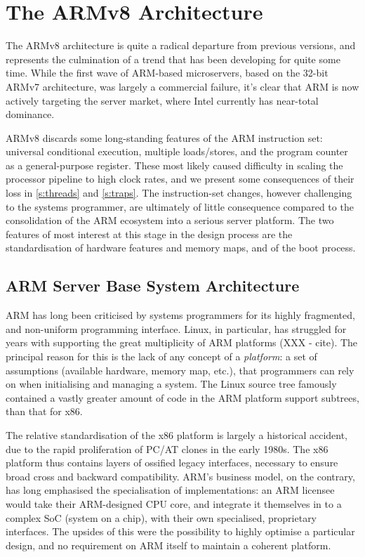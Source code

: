 \documentclass[a4paper,twoside]{report}
\begin{document}
\section{The ARMv8 Architecture}

The ARMv8 architecture is quite a radical departure from previous versions,
and represents the culmination of a trend that has been developing for quite
some time. While the first wave of ARM-based microservers, based on the 32-bit
ARMv7 architecture, was largely a commercial failure, it's clear that ARM is
now actively targeting the server market, where Intel currently has near-total
dominance.

ARMv8 discards some long-standing features of the ARM instruction set:
universal conditional execution, multiple loads/stores, and the program
counter as a general-purpose register. These most likely caused difficulty in
scaling the processor pipeline to high clock rates, and we present some
consequences of their loss in \autoref{s:threads} and \autoref{s:traps}. The
instruction-set changes, however challenging to the systems programmer, are
ultimately of little consequence compared to the consolidation of the ARM
ecosystem into a serious server platform. The two features of most interest at
this stage in the design process are the standardisation of hardware features
and memory maps, and of the boot process.

\subsection{ARM Server Base System Architecture}\label{s:sbsa}

ARM has long been criticised by systems programmers for its highly fragmented,
and non-uniform programming interface. Linux, in particular, has struggled for
years with supporting the great multiplicity of ARM platforms (XXX - cite).
The principal reason for this is the lack of any concept of a \emph{platform}:
a set of assumptions (available hardware, memory map, etc.), that programmers
can rely on when initialising and managing a system. The Linux source tree
famously contained a vastly greater amount of code in the ARM platform support
subtrees, than that for x86.

The relative standardisation of the x86 platform is largely a historical
accident, due to the rapid proliferation of PC/AT clones in the early 1980s.
The x86 platform thus contains layers of ossified legacy interfaces, necessary
to ensure broad cross and backward compatibility.  ARM's business model, on
the contrary, has long emphasised the specialisation of implementations: an
ARM licensee would take their ARM-designed CPU core, and integrate it
themselves in to a complex SoC (system on a chip), with their own specialised,
proprietary interfaces. The upsides of this were the possibility to highly
optimise a particular design, and no requirement on ARM itself to maintain a
coherent platform.
\end{document}
